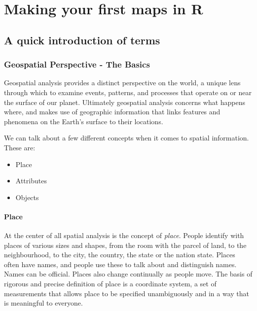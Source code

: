 \documentclass[]{book}
\providecommand{\tightlist}{%
  \setlength{\itemsep}{0pt}\setlength{\parskip}{0pt}}
\begin{document}
\hypertarget{making-your-first-maps-in-r}{%
\chapter{Making your first maps in R}\label{making-your-first-maps-in-r}}

\hypertarget{a-quick-introduction-of-terms}{%
\section{A quick introduction of terms}\label{a-quick-introduction-of-terms}}

\hypertarget{geospatial-perspective---the-basics}{%
\subsection{Geospatial Perspective - The Basics}\label{geospatial-perspective---the-basics}}

Geospatial analysis provides a distinct perspective on the world, a unique lens through which to examine events, patterns, and processes that operate on or near the surface of our planet. Ultimately geospatial analysis concerns what happens where, and makes use of geographic information that links features and phenomena on the Earth's surface to their locations.

We can talk about a few different concepts when it comes to spatial information. These are:

\begin{itemize}
\tightlist
\item
  Place
\item
  Attributes
\item
  Objects
\end{itemize}

\hypertarget{place}{%
\subsubsection{Place}\label{place}}

At the center of all spatial analysis is the concept of \emph{place}. People identify with places of various sizes and shapes, from the room with the parcel of land, to the neighbourhood, to the city, the country, the state or the nation state. Places often have names, and people use these to talk about and distinguish names. Names can be official. Places also change continually as people move. The basis of rigorous and precise definition of place is a coordinate system, a set of measurements that allows place to be specified unambiguously and in a way that is meaningful to everyone.
\end{document}
